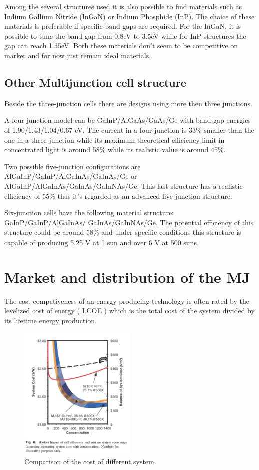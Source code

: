 \documentclass[11pt]{article} %
\begin{document}
Among the several structures used it is also possible to find materials such as Indium Gallium Nitride (InGaN) or Indium Phosphide (InP). The choice of these materials is preferable if specific band gaps are required. For the InGaN, it is possible to tune the band gap from 0.8eV to 3.5eV while for InP structures the gap can reach 1.35eV. Both these materials don't seem to be competitive on market and for now just remain ideal materials.

\subsection{Other Multijunction cell structure}

Beside the three-junction cells there are designs using more then three junctions.  

A four-junction model can be GaInP/AlGaAs/GaAs/Ge with band gap energies of 1.90/1.43/1.04/0.67 eV. The current in a four-junction is 33\% smaller than the one in a three-junction while its maximum theoretical efficiency limit in concentrated light is around 58\%  while its realistic value is around 45\%.  

Two possible five-junction configurations are AlGaInP/GaInP/AlGaInAs/GaInAs/Ge or AlGaInP/AlGaInAs/GaInAs/GaInNAs/Ge. This last structure has a realistic efficiency  of 55\% thus it's regarded as an advanced five-junction structure. 

Six-junction cells have the following material structure: GaInP/GaInP/AlGaInAs/ GaInAs/GaInNAs/Ge. The potential efficiency of this structure could be around 58\% and under specific conditions this structure is capable of producing 5.25 V at 1 sun and over 6 V at 500 suns.

\section{Market and distribution of the MJ}

The cost competiveness of an energy producing technology is often rated by the levelized cost of energy ( LCOE )  which is  the  total  cost  of  the  system  divided  by  its  lifetime  energy production.

\begin{figure}
	\centering
	\includegraphics[width=0.5\textwidth]{img/sadasd.png}
	\caption{Comparison of the cost of different system.}
	\vspace{-10pt}
\end{figure}
 
\end{document}
